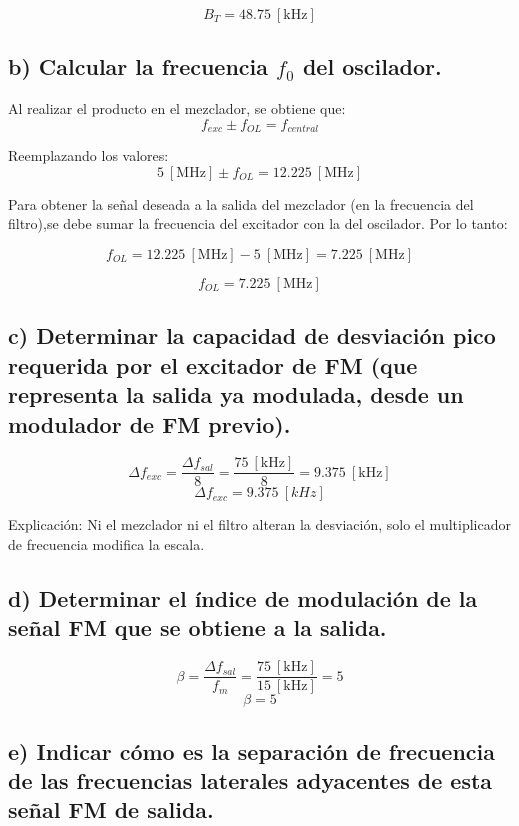     \[
        \boxed{B_T = 48.75~[\text{kHz}]}
    \]

\subsection*{b) Calcular la frecuencia $f_0$ del oscilador.}   

Al realizar el producto en el mezclador, se obtiene que:
    \[
        f_{exc} \pm f_{OL} = f_{central}
    \]

Reemplazando los valores:
    \[
        5~[\text{MHz}] \pm f_{OL} = 12.225~[\text{MHz}]
    \]

Para obtener la señal deseada a la salida del mezclador (en la frecuencia del filtro),se debe sumar la frecuencia del excitador con la del oscilador. Por lo tanto:
    
    \[
        f_{OL} = 12.225~[\text{MHz}] - 5~[\text{MHz}] = 7.225~[\text{MHz}]
    \]
    
    \[
        \boxed{f_{OL} = 7.225~[\text{MHz}]}
    \]

\subsection*{c) Determinar la capacidad de desviación pico requerida por el excitador de FM (que representa la salida ya modulada, desde un modulador de FM previo).}  

    \[
        \Delta f_{exc} = \frac{\Delta f_{sal}}{8} = \frac{75~[\text{kHz}]}{8} = 9.375~[\text{kHz}]
    \]
    \[
        \boxed{\Delta f_{exc} = 9.375~[kHz]}
    \]

Explicación:  Ni el mezclador ni el filtro alteran la desviación, solo el multiplicador de frecuencia modifica la escala.

\subsection*{d) Determinar el índice de modulación de la señal FM que se obtiene a la salida.}

    \[
        \beta = \frac{\Delta f_{sal}}{f_m} = \frac{75~[\text{kHz}]}{15~[\text{kHz}]} = 5
    \]
    \[
        \boxed{\beta = 5}
    \]


\subsection*{e) Indicar cómo es la separación de frecuencia de las frecuencias laterales adyacentes de esta señal FM de salida.}  

